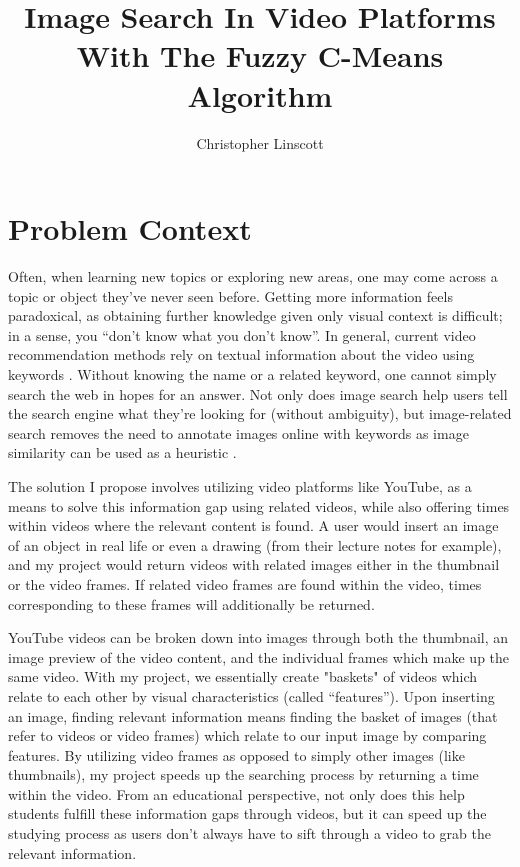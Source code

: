 \documentclass[10pt,twocolumn]{article}
\title{Image Search In Video Platforms With The Fuzzy C-Means Algorithm}
\author{Christopher Linscott}
\affiliation{Occidental College}
\begin{document}
\maketitle


\section{Problem Context}

Often, when learning new topics or exploring new areas, one may come across a topic or object they’ve never seen before. Getting more information feels paradoxical, as obtaining further knowledge given only visual context is difficult; in a sense, you “don’t know what you don’t know”. In general, current video recommendation methods rely on textual information about the video using keywords \cite{Stanford2021}. Without knowing the name or a related keyword, one cannot simply search the web in hopes for an answer. Not only does image search help users tell the search engine what they’re looking for (without ambiguity), but image-related search removes the need to annotate images online with keywords as image similarity can be used as a heuristic \cite{Adrakatti2016}.

The solution I propose involves utilizing video platforms like YouTube, as a means to solve this information gap using related videos, while also offering times within videos where the relevant content is found. A user would insert an image of an object in real life or even a drawing (from their lecture notes for example), and my project would return videos with related images either in the thumbnail or the video frames. If related video frames are found within the video, times corresponding to these frames will additionally be returned.

YouTube videos can be broken down into images through both the thumbnail, an image preview of the video content, and the individual frames which make up the same video. With my project, we essentially create "baskets" of videos which relate to each other by visual characteristics (called “features”). Upon inserting an image, finding relevant information means finding the basket of images (that refer to videos or video frames) which relate to our input image by comparing features. By utilizing video frames as opposed to simply other images (like thumbnails), my project speeds up the searching process by returning a time within the video. From an educational perspective, not only does this help students fulfill these information gaps through videos, but it can speed up the studying process as users don’t always have to sift through a video to grab the relevant information.
\end{document}
